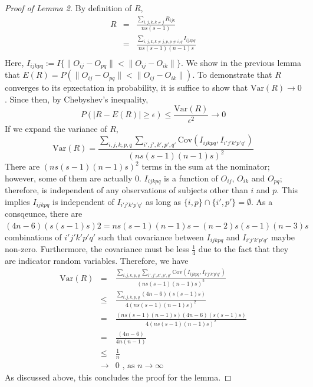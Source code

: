 \documentclass{article}
\begin{document}
\begin{proof}[Proof of Lemma 2]
By definition of $R$,
\begin{eqnarray*}  
R &=&\frac{\sum\limits_{i,j,k,k\neq j} R_{ijk}}{ns(s-1)}\\
&=& \frac{\sum\limits_{i,j,k,k \neq j,p,p\neq i,q} I_{ijkpq}}{ns(s-1)(n-1)s}\\
\end{eqnarray*}
Here, $I_{ijkpq}:=I\{\|O_{ij}-O_{pq}\| < \|O_{ij}-O_{ik}\| \}$. We show in the previous lemma that $E(R)=P(\|O_{ij}-O_{pq}\| < \|O_{ij}-O_{ik}\|)$. To demonstrate that $R$ converges to its epxectation in probability, it is suffice to show that $\text{Var}(R) \rightarrow 0$. Since then, by Chebyshev's inequality,
\[P(|R-E(R)| \geq \epsilon) \leq \frac{\text{Var}(R)}{\epsilon^2} \rightarrow 0\]
If we expand the variance of $R$, 
\[\text{Var}(R)= \frac{\sum\limits_{i,j,k,p,q} \sum\limits_{i',j',k',p',q'} \text{Cov}(I_{ijkpq},I_{i'j'k'p'q'})}{(ns(s-1)(n-1)s)^2} \]
There are $(ns(s-1)(n-1)s)^2$ terms in the sum at the nominator; however, some of them are actually 0. $I_{ijkpq}$ is a function of $O_{ij}$, $O_{ik}$ and $O_{pq}$; therefore, is independent of any observations of subjects other than $i$ and $p$. This implies $I_{ijkpq}$ is independent of $I_{i'j'k'p'q'}$ as long as $\{i,p\} \cap \{i',p'\} = \emptyset$. As a consqeunce, there are $(4n-6)(s(s-1)s)2=ns(s-1)(n-1)s-(n-2)s(s-1)(n-3)s$ combinations of $i'j'k'p'q'$ such that covariance between $I_{ijkpq}$ and $I_{i'j'k'p'q'}$ maybe non-zero. Furthermore, the covariance must be less $\frac{1}{4}$ due to the fact that they are indicator random variables. Therefore, we have 
\begin{eqnarray*} 
\text{Var}(R)&=& \frac{\sum\limits_{i,j,k,p,q} \sum\limits_{i',j',k',p',q'} \text{Cov}(I_{ijkpq},I_{i'j'k'p'q'})}{(ns(s-1)(n-1)s)^2} \\
&\leq& \frac{\sum\limits_{i,j,k,p,q}  (4n-6)(s(s-1)s)}{4(ns(s-1)(n-1)s)^2} \\
&=& \frac{ (ns(s-1)(n-1)s)(4n-6)(s(s-1)s)}{4(ns(s-1)(n-1)s)^2} \\
&=& \frac{(4n-6)}{4n(n-1)} \\
&\leq& \frac{1}{n}  \\
&\rightarrow& 0 \text{ , as $n\rightarrow \infty$} 
\end{eqnarray*}
As discussed above, this concludes the proof for the lemma.
\end{proof}
\end{document}
